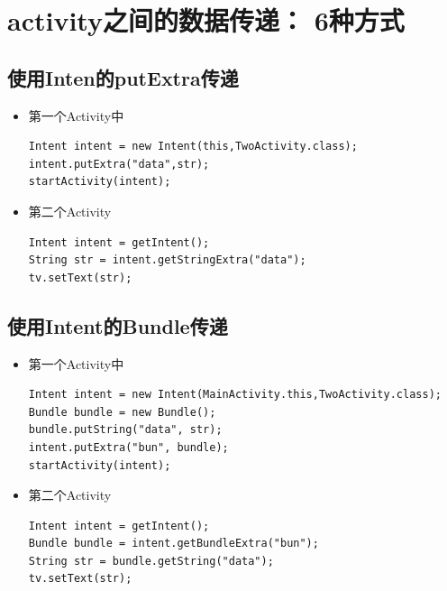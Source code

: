 \documentclass[9pt, b5paaper]{book}
\begin{document}
\section{activity之间的数据传递： 6种方式}
\label{sec-1-6}
\subsection{使用Inten的putExtra传递}
\label{sec-1-6-1}
\begin{itemize}
\item 第一个Activity中
\begin{verbatim}
Intent intent = new Intent(this,TwoActivity.class);
intent.putExtra("data",str);
startActivity(intent);
\end{verbatim}
\item 第二个Activity
\begin{verbatim}
Intent intent = getIntent();
String str = intent.getStringExtra("data");
tv.setText(str);
\end{verbatim}
\end{itemize}
\subsection{使用Intent的Bundle传递}
\label{sec-1-6-2}
\begin{itemize}
\item 第一个Activity中
\begin{verbatim}
Intent intent = new Intent(MainActivity.this,TwoActivity.class);
Bundle bundle = new Bundle();
bundle.putString("data", str);
intent.putExtra("bun", bundle);
startActivity(intent);
\end{verbatim}
\item 第二个Activity
\begin{verbatim}
Intent intent = getIntent();
Bundle bundle = intent.getBundleExtra("bun");
String str = bundle.getString("data");
tv.setText(str);
\end{verbatim}
\end{itemize}
\end{document}
